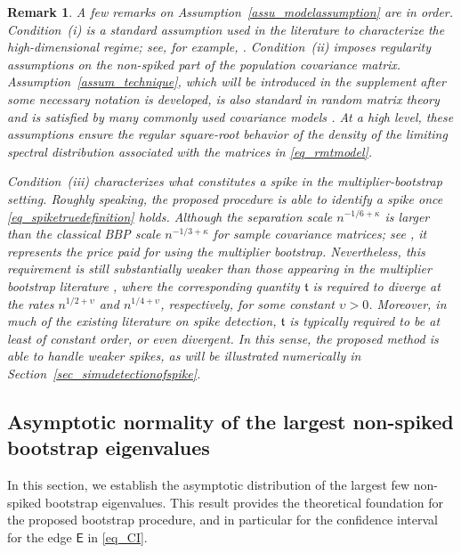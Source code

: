 \documentclass[12pt]{article}
\theoremstyle{plain}
\newtheorem{remark}{Remark}[section]
\numberwithin{equation}{section}
\begin{document}
\begin{remark}
	A few remarks on Assumption~\ref{assu_modelassumption} are in order. Condition~(i) is a standard assumption used in the literature to characterize the high-dimensional regime; see, for example, \citep{YaoZhengBai2015,Johnstone2007}. Condition~(ii) imposes regularity assumptions on the non-spiked part of the population covariance matrix. Assumption~\ref{assum_technique}, which will be introduced in the supplement after some necessary notation is developed, is also standard in random matrix theory and is satisfied by many commonly used covariance models \citep{knowles2017anisotropic,el2007tracy, BaiSilverstein2010,Karoui2009,lee2016tracy,Fan2019separable}. At a high level, these assumptions ensure the regular square-root behavior of the density of the limiting spectral distribution associated with the matrices in \eqref{eq_rmtmodel}.
	
	Condition~(iii) characterizes what constitutes a spike in the multiplier-bootstrap setting. Roughly speaking, the proposed procedure is able to identify a spike once \eqref{eq_spiketruedefinition} holds. Although the separation scale $n^{-1/6+\kappa}$ is larger than the classical BBP scale $n^{-1/3+\kappa}$ for sample covariance matrices; see \citep{bloemendal2016principal,ding2021spiked,DingYang2021}, it represents the price paid for using the multiplier bootstrap. Nevertheless, this requirement is still substantially weaker than those appearing in the multiplier bootstrap literature \citep{el2019non,boostsanalysis}, where the corresponding quantity $\mathfrak t$ is required to diverge at the rates $n^{1/2+\upsilon}$ and $n^{1/4+\upsilon}$, respectively, for some constant $\upsilon>0$. Moreover, in much of the existing literature on spike detection, $\mathfrak t$ is typically required to be at least of constant order, or even divergent. In this sense, the proposed method is able to handle weaker spikes, as will be illustrated numerically in Section~\ref{sec_simudetectionofspike}.
\end{remark}







\subsection{Asymptotic normality of the largest non-spiked bootstrap eigenvalues}
In this section, we establish the asymptotic distribution of the largest few non-spiked bootstrap eigenvalues. This result provides the  theoretical foundation for  the proposed bootstrap procedure, and in particular for the confidence interval for the edge $\mathsf E$ in \eqref{eq_CI}.
\end{document}

